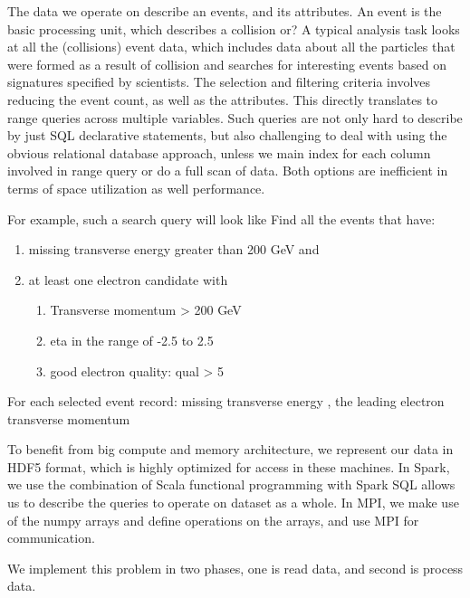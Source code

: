 \documentclass[11pt, twocolumn]{article}
\begin{document}
The data we operate on describe an events, and its attributes. 
An event is the basic processing unit, which describes a collision or? 
A typical analysis task looks at all the (collisions) event data, which includes data about 
all the particles that were formed as a result of collision and searches for 
interesting events based on signatures specified by scientists. 
The selection and filtering criteria involves reducing the event count, 
as well as the attributes. This directly translates to range queries 
across multiple variables. Such queries are not only hard to 
describe by just SQL declarative statements, but also 
challenging to deal with using the obvious relational database approach, 
unless we main index for each column involved in range query or do a 
full scan of data. Both options are inefficient in terms of space utilization 
as well performance. 

For example, such a search query will look like 
Find all the events that have:
\begin{enumerate}
\item missing transverse energy greater than 200 GeV and 
\item at least one electron candidate with 
\begin{enumerate}
\item Transverse momentum > 200 GeV
\item eta in the range of -2.5 to 2.5
\item good electron quality: qual > 5
\end{enumerate}
\end{enumerate}
For each selected event record: missing transverse energy , the leading electron transverse momentum

To benefit from big compute and memory architecture, we represent our data 
in HDF5 format, which is highly optimized for access in these machines. 
In Spark, we use the combination of Scala functional programming with Spark SQL 
allows us to describe the queries to operate on dataset as a whole. 
In MPI, we make use of the numpy arrays and define operations on the arrays, 
and use MPI for communication. 

We implement this problem in two phases, one is read data, and second is process data. 

\end{document}
